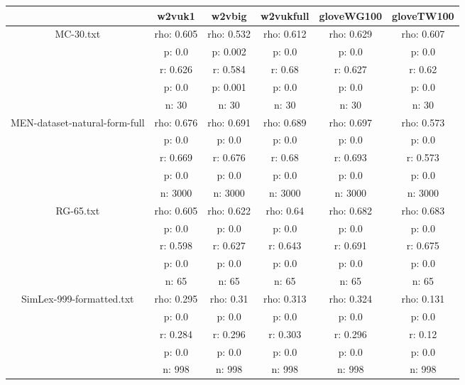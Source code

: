 \documentclass{article}
\begin{document}
\begin{tabular}{cccccc|}\cline{2-6}
&\multicolumn{1}{|c}{w2vuk1} & w2vbig & w2vukfull & gloveWG100 & gloveTW100 \\\hline
\multicolumn{1}{|c|}{\multirow{5}{*}{MC-30.txt}} & rho: 0.605 & rho: 0.532 & rho: 0.612 & rho: 0.629 & rho: 0.607 \\
\multicolumn{1}{|c|}{} & p: 0.0 & p: 0.002 & p: 0.0 & p: 0.0 & p: 0.0 \\
\multicolumn{1}{|c|}{} & r: 0.626 & r: 0.584 & r: 0.68 & r: 0.627 & r: 0.62 \\
\multicolumn{1}{|c|}{} & p: 0.0 & p: 0.001 & p: 0.0 & p: 0.0 & p: 0.0 \\
\multicolumn{1}{|c|}{} & n: 30 & n: 30 & n: 30 & n: 30 & n: 30 \\
\hline
\multicolumn{1}{|c|}{\multirow{5}{*}{MEN-dataset-natural-form-full}} & rho: 0.676 & rho: 0.691 & rho: 0.689 & rho: 0.697 & rho: 0.573 \\
\multicolumn{1}{|c|}{} & p: 0.0 & p: 0.0 & p: 0.0 & p: 0.0 & p: 0.0 \\
\multicolumn{1}{|c|}{} & r: 0.669 & r: 0.676 & r: 0.68 & r: 0.693 & r: 0.573 \\
\multicolumn{1}{|c|}{} & p: 0.0 & p: 0.0 & p: 0.0 & p: 0.0 & p: 0.0 \\
\multicolumn{1}{|c|}{} & n: 3000 & n: 3000 & n: 3000 & n: 3000 & n: 3000 \\
\hline
\multicolumn{1}{|c|}{\multirow{5}{*}{RG-65.txt}} & rho: 0.605 & rho: 0.622 & rho: 0.64 & rho: 0.682 & rho: 0.683 \\
\multicolumn{1}{|c|}{} & p: 0.0 & p: 0.0 & p: 0.0 & p: 0.0 & p: 0.0 \\
\multicolumn{1}{|c|}{} & r: 0.598 & r: 0.627 & r: 0.643 & r: 0.691 & r: 0.675 \\
\multicolumn{1}{|c|}{} & p: 0.0 & p: 0.0 & p: 0.0 & p: 0.0 & p: 0.0 \\
\multicolumn{1}{|c|}{} & n: 65 & n: 65 & n: 65 & n: 65 & n: 65 \\
\hline
\multicolumn{1}{|c|}{\multirow{5}{*}{SimLex-999-formatted.txt}} & rho: 0.295 & rho: 0.31 & rho: 0.313 & rho: 0.324 & rho: 0.131 \\
\multicolumn{1}{|c|}{} & p: 0.0 & p: 0.0 & p: 0.0 & p: 0.0 & p: 0.0 \\
\multicolumn{1}{|c|}{} & r: 0.284 & r: 0.296 & r: 0.303 & r: 0.296 & r: 0.12 \\
\multicolumn{1}{|c|}{} & p: 0.0 & p: 0.0 & p: 0.0 & p: 0.0 & p: 0.0 \\
\multicolumn{1}{|c|}{} & n: 998 & n: 998 & n: 998 & n: 998 & n: 998 \\

\end{tabular}
\end{document}
